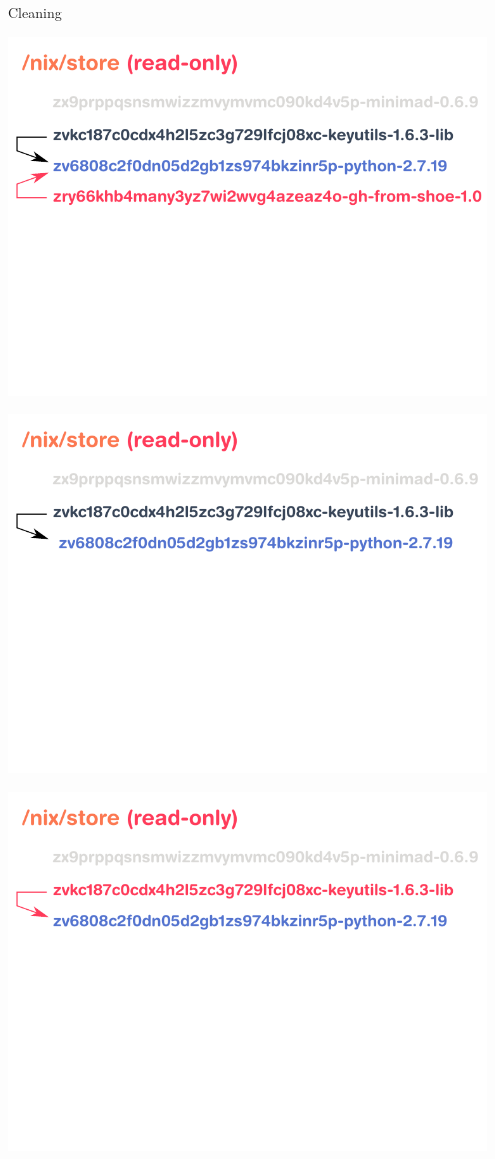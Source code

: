 \documentclass[a4paper]{beamer}
\begin{document}
\begin{frame}{Cleaning}
     {
        \begin{center}
            \includegraphics[width=0.95\textwidth]{img/schema-nix-store-cleaning-1.pdf}
        \end{center}
    }
     {
        \begin{center}
            \includegraphics[width=0.95\textwidth]{img/schema-nix-store-cleaning-2.pdf}
        \end{center}
    }
     {
        \begin{center}
            \includegraphics[width=0.95\textwidth]{img/schema-nix-store-cleaning-3.pdf}

\end{center}}
\end{frame}
\end{document}
